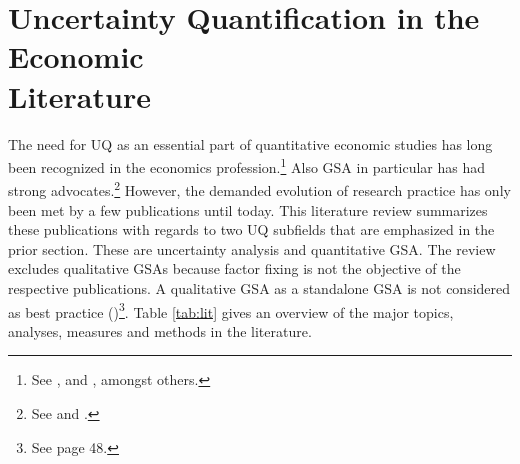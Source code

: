\documentclass[a4paper,12pt]{article}
\begin{document}
\section{Uncertainty Quantification in the Economic \\ Literature}
\thispagestyle{plain} %

The need for UQ as an essential part of quantitative economic studies has long been recognized in the economics profession.\footnote{See \cite{Hansen.1996}, \cite{Kydland.1992} and \cite{Canova.1994}, amongst others.} Also GSA in particular has had strong advocates.\footnote{See \cite{Canova.1995} and \cite{Gregory.1995}.} However, the demanded evolution of research practice has only been met by a few publications until today. This literature review summarizes these publications with regards to two UQ subfields that are emphasized in the prior section. These are uncertainty analysis and quantitative GSA. The review excludes qualitative GSAs because factor fixing is not the objective of the respective publications. A qualitative GSA as a standalone GSA is not considered as best practice (\cite{Saltelli.2004})\footnote{See page 48.}. Table \ref{tab:lit} gives an overview of the major topics, analyses, measures and methods in the literature.
\end{document}
